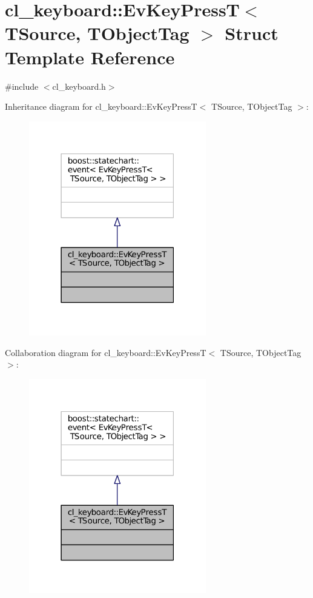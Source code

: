 \hypertarget{structcl__keyboard_1_1EvKeyPressT}{}\section{cl\+\_\+keyboard\+:\+:Ev\+Key\+PressT$<$ T\+Source, T\+Object\+Tag $>$ Struct Template Reference}
\label{structcl__keyboard_1_1EvKeyPressT}


{\ttfamily \#include $<$cl\+\_\+keyboard.\+h$>$}



Inheritance diagram for cl\+\_\+keyboard\+:\+:Ev\+Key\+PressT$<$ T\+Source, T\+Object\+Tag $>$\+:
\nopagebreak
\begin{figure}[H]
\begin{center}
\leavevmode
\includegraphics[width=219pt]{structcl__keyboard_1_1EvKeyPressT__inherit__graph}
\end{center}
\end{figure}


Collaboration diagram for cl\+\_\+keyboard\+:\+:Ev\+Key\+PressT$<$ T\+Source, T\+Object\+Tag $>$\+:
\nopagebreak
\begin{figure}[H]
\begin{center}
\leavevmode
\includegraphics[width=219pt]{structcl__keyboard_1_1EvKeyPressT__coll__graph}
\end{center}
\end{figure}


